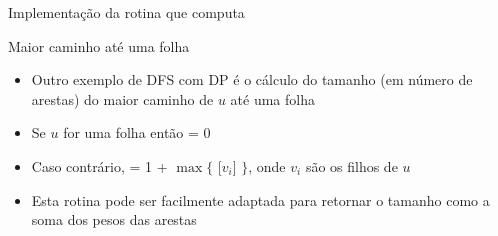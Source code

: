 \begin{frame}[fragile]{Implementação da rotina que computa }
\end{frame}

\begin{frame}[fragile]{Maior caminho até uma folha}

    \begin{itemize}
        \item Outro exemplo de DFS com DP é o cálculo do tamanho (em número de arestas) do
            maior caminho   de $u$ até uma folha

        \item Se $u$ for uma folha então  = 0

        \item Caso contrário,  = 1 + $\max \lbrace$ [$v_i$] 
        $\rbrace$, onde $v_i$ são os filhos de $u$

        \item Esta rotina pode ser facilmente adaptada para retornar o tamanho como a soma dos
            pesos das arestas
    \end{itemize}

\end{frame}

